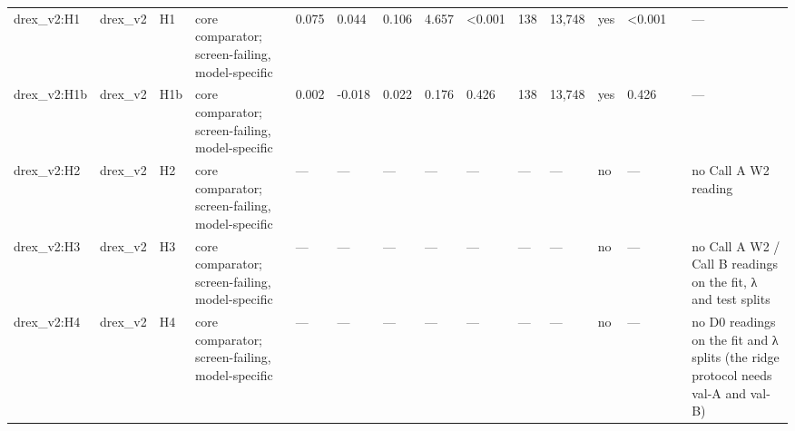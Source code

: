 \begin{tabular}{lllllllllllllll}
drex\_v2:H1 & drex\_v2 & H1 & core comparator; screen-failing, model-specific & 0.075 & 0.044 & 0.106 & 4.657 & <0.001 & 138 & 13,748 & yes & <0.001 &  & — \\
drex\_v2:H1b & drex\_v2 & H1b & core comparator; screen-failing, model-specific & 0.002 & -0.018 & 0.022 & 0.176 & 0.426 & 138 & 13,748 & yes & 0.426 &  & — \\
drex\_v2:H2 & drex\_v2 & H2 & core comparator; screen-failing, model-specific & — & — & — & — & — & — & — & no & — &  & no Call A W2 reading \\
drex\_v2:H3 & drex\_v2 & H3 & core comparator; screen-failing, model-specific & — & — & — & — & — & — & — & no & — &  & no Call A W2 / Call B readings on the fit, λ and test splits \\
drex\_v2:H4 & drex\_v2 & H4 & core comparator; screen-failing, model-specific & — & — & — & — & — & — & — & no & — &  & no D0 readings on the fit and λ splits (the ridge protocol needs val-A and val-B) \\
\bottomrule
\end{tabular}
